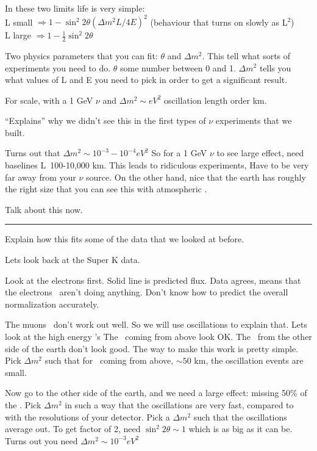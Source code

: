 {In these two limits life is very simple:\\
L small  $\Rightarrow 1 - \sin^2 2\theta \left(\Delta m^2 L/4E\right)^2$  (behaviour that turns on slowly as L$^2$)\\
L large  $\Rightarrow 1 - \frac{1}{2}\sin^2 2\theta $  

Two physics parameters that you can fit: $\theta$ and  $\Delta m^2$.
This tell what sorts of experiments you need to do.
$\theta$ some number between 0 and 1. 
$\Delta m^2$ tells you what values of L and E you need to pick in order to get a significant result.

For scale, with a 1 GeV $\nu$ and $\Delta m^2 \sim eV^2$ oscillation length order km. 

``Explains'' why we didn't see this in the first types of $\nu$ experiments that we built.  


Turns out that $\Delta m^2 \sim 10^{-3}-10^{-4}eV^2$
So for a 1 GeV $\nu$ to see large effect, need baselines L~100-10,000 km.  
This leads to ridiculous experiments, Have to be very far away from your $\nu$ source.  
On the other hand, nice that the earth has roughly the right size that you can see this with atmospheric \nus. 

Talk about this now. 

\noindent\rule{\textwidth}{1pt}

Explain how this fits some of the data that we looked at before.

Lets look back at the Super K data. 

Look at the electrons first.
Solid line is predicted flux. 
Data agrees, means that the electrons \nus\ aren't doing anything.
Don't know how to predict the overall normalization accurately. 

The muons \nus\ don't work out well. 
So we will use oscillations to explain that.
Lets look at the high energy \numu's
The \nus\ coming from above look OK. 
The \nus\ from the other side of the earth don't look good. 
The way to make this work is pretty simple. 
Pick $\Delta m^2$ such that for \nus\ coming from above, $\sim50$ km, the oscillation events are small. 

Now go to the other side of the earth, and we need a large effect: missing 50\% of the \nus.
Pick $\Delta m^2$ in such a way that the oscillations are very fast, compared to with the resolutions of your detector. 
Pick a $\Delta m^2$ such that the oscillations average out.
To get factor of 2, need $\sin^2 2\theta \sim 1 $ which is as big as it can be. 
Turns out you need $\Delta m^2 \sim 10^{-3} eV^2$


}
